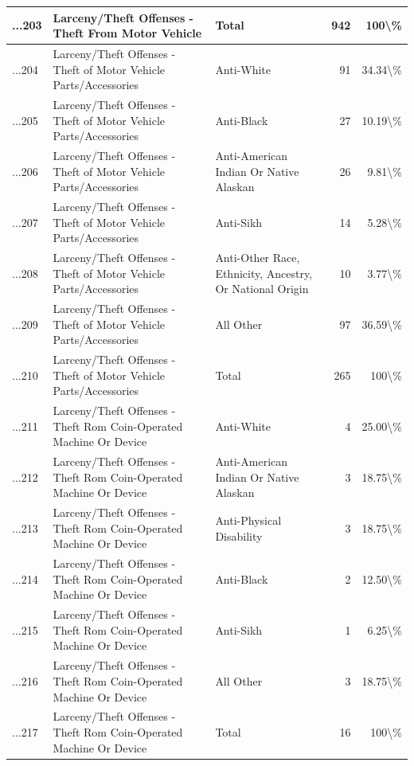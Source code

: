 \documentclass[
]{krantz}
\begin{document}
\begin{longtable}[t]{l|l|l|r|r}
\hline
...203 & Larceny/Theft Offenses - Theft From Motor Vehicle & Total & 942 & 100\textbackslash{}\%\\
\hline
...204 & Larceny/Theft Offenses - Theft of Motor Vehicle Parts/Accessories & Anti-White & 91 & 34.34\textbackslash{}\%\\
\hline
...205 & Larceny/Theft Offenses - Theft of Motor Vehicle Parts/Accessories & Anti-Black & 27 & 10.19\textbackslash{}\%\\
\hline
...206 & Larceny/Theft Offenses - Theft of Motor Vehicle Parts/Accessories & Anti-American Indian Or Native Alaskan & 26 & 9.81\textbackslash{}\%\\
\hline
...207 & Larceny/Theft Offenses - Theft of Motor Vehicle Parts/Accessories & Anti-Sikh & 14 & 5.28\textbackslash{}\%\\
\hline
...208 & Larceny/Theft Offenses - Theft of Motor Vehicle Parts/Accessories & Anti-Other Race, Ethnicity, Ancestry, Or National Origin & 10 & 3.77\textbackslash{}\%\\
\hline
...209 & Larceny/Theft Offenses - Theft of Motor Vehicle Parts/Accessories & All Other & 97 & 36.59\textbackslash{}\%\\
\hline
...210 & Larceny/Theft Offenses - Theft of Motor Vehicle Parts/Accessories & Total & 265 & 100\textbackslash{}\%\\
\hline
...211 & Larceny/Theft Offenses - Theft Rom Coin-Operated Machine Or Device & Anti-White & 4 & 25.00\textbackslash{}\%\\
\hline
...212 & Larceny/Theft Offenses - Theft Rom Coin-Operated Machine Or Device & Anti-American Indian Or Native Alaskan & 3 & 18.75\textbackslash{}\%\\
\hline
...213 & Larceny/Theft Offenses - Theft Rom Coin-Operated Machine Or Device & Anti-Physical Disability & 3 & 18.75\textbackslash{}\%\\
\hline
...214 & Larceny/Theft Offenses - Theft Rom Coin-Operated Machine Or Device & Anti-Black & 2 & 12.50\textbackslash{}\%\\
\hline
...215 & Larceny/Theft Offenses - Theft Rom Coin-Operated Machine Or Device & Anti-Sikh & 1 & 6.25\textbackslash{}\%\\
\hline
...216 & Larceny/Theft Offenses - Theft Rom Coin-Operated Machine Or Device & All Other & 3 & 18.75\textbackslash{}\%\\
\hline
...217 & Larceny/Theft Offenses - Theft Rom Coin-Operated Machine Or Device & Total & 16 & 100\textbackslash{}\%\\
\hline

\end{longtable}
\end{document}
